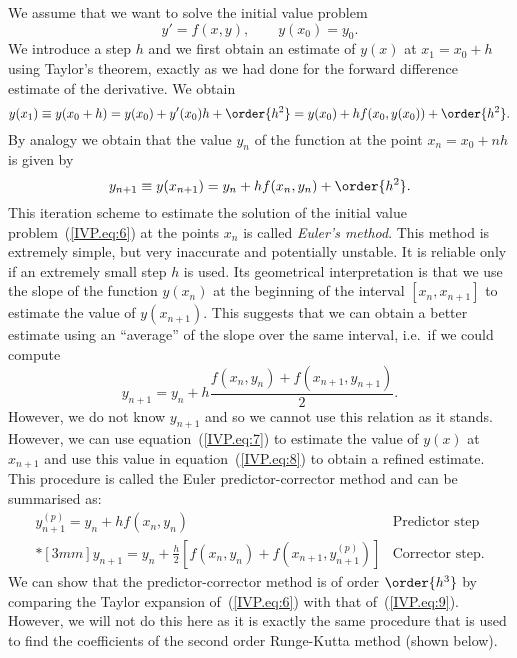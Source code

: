 We assume that we want to solve the initial value problem
%
\begin{equation}
  y' = f(x,y) , \qquad y(x_0) = y_0 .
  \label{IVP.eq:6}
\end{equation}
%
We introduce a step $h$ and we first obtain an estimate of $y(x)$ at
$x_1 = x_0 + h$ using Taylor's theorem, exactly as we had done for the
forward difference estimate of the derivative.  We obtain
%
\begin{equation}
  y(x_1) \equiv y(x_0+h) = y(x_0) + y'(x_0) h + \order{h^2} =
  y(x_0) + h f(x_0,y(x_0)) + \order{h^2} .
  \label{IVP.eq:7}
\end{equation}
%
By analogy we obtain that the value $y_n$ of the function at the point
$x_n = x_0 + n h$ is given by
%
\begin{equation}
  y_{n+1} \equiv y(x_{n+1}) = y_{n} + h f(x_{n},y_{n}) + \order{h^2} .
  \label{IVP.eq:10}
\end{equation}
%
This iteration scheme to estimate the solution of the initial value
problem~(\ref{IVP.eq:6}) at the points $x_n$ is called \textit{Euler's
  method}.  This method is extremely simple, but very inaccurate and
potentially unstable.  It is reliable only if an extremely small step
$h$ is used.  Its geometrical interpretation is that we use the slope
of the function $y(x_n)$ at the beginning of the interval
$[x_n,x_{n+1}]$ to estimate the value of $y(x_{n+1})$.  This suggests
that we can obtain a better estimate using an ``average'' of the slope
over the same interval, i.e.\ if we could compute
%
\begin{equation}
  y_{n+1} = y_n + h \frac{f(x_n,y_n) + f(x_{n+1},y_{n+1})}{2} .
  \label{IVP.eq:8}
\end{equation}
%
However, we do not know $y_{n+1}$ and so we cannot use this relation
as it stands.  However, we can use equation~(\ref{IVP.eq:7}) to
estimate the value of $y(x)$ at $x_{n+1}$ and use this value in
equation~(\ref{IVP.eq:8}) to obtain a refined estimate.  This
procedure is called the Euler predictor-corrector method and can be
summarised as:
%
\begin{equation}
  \begin{array}{ll}
    y^{(p)}_{n+1} = y_n + h f(x_n,y_n) & \text{Predictor step} \\*[3mm]
    y_{n+1} = y_n + \displaystyle \frac{h}{2}
    \left [f(x_n,y_n) + f(x_{n+1},y^{(p)}_{n+1}) \right ] &
    \text{Corrector step}.
  \end{array}
  \label{IVP.eq:9}
\end{equation}
%
We can show that the predictor-corrector method is of order $\order{h^3}$
by comparing the Taylor expansion of~(\ref{IVP.eq:6}) with that
of~(\ref{IVP.eq:9}).  However, we will not do this here as it is
exactly the same procedure that is used to find the coefficients of
the second order Runge-Kutta method (shown below).

